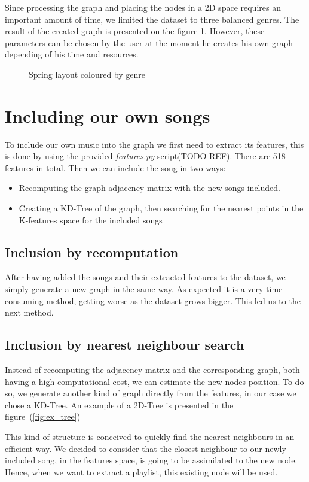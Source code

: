 Since processing the graph and placing the nodes in a 2D space requires an important amount of time, we limited the dataset to three balanced genres. The result of the created graph is presented on the figure \ref{fig:spring_layout}. However, these parameters can be chosen by the user at the moment he creates his own graph depending of his time and resources.

\begin{figure}[H]
\centering
\caption{Spring layout coloured by genre}
\label{fig:spring_layout}
\end{figure}
\section{Including our own songs}

To include our own music into the graph we first need to extract its features, this is done by using
the provided \textit{features.py} script(TODO REF). There are 518 features in total.
Then we can include the song in two ways:
\begin{itemize}
\item Recomputing the graph adjacency matrix with the new songs included.
\item Creating a KD-Tree of the graph, then searching for the nearest points in the K-features space for the included songs
\end{itemize}

\subsection{Inclusion by recomputation}
After having added the songs and their extracted features to the dataset, we simply generate a new graph in the same way. As expected it is a very time consuming method, getting worse as the dataset grows bigger. This led us to the next method. 

\subsection{Inclusion by nearest neighbour search}
Instead of recomputing the adjacency matrix and the corresponding graph, both having a high computational cost, we can estimate the new nodes position. To do so, we generate another kind of graph directly from the features, in our case we chose a KD-Tree.
An example of a 2D-Tree is presented in the figure~(\ref{fig:ex_tree})

This kind of structure is conceived to quickly find the nearest neighbours in an efficient way.
We decided to consider that the closest neighbour to our newly included song, in the features space, is going to be assimilated to the new node. Hence, when we want to extract a playlist, this existing node will be used. %

